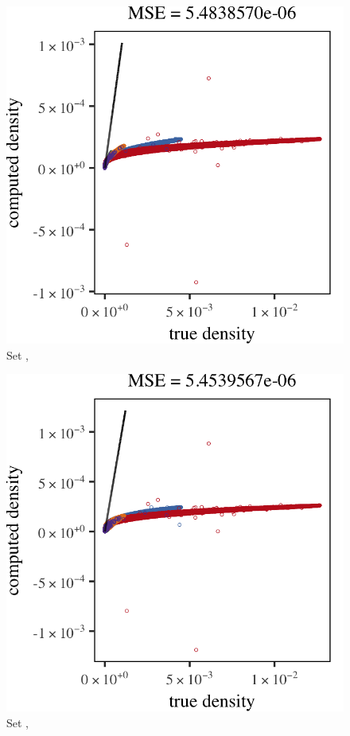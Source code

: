 \begin{subfigure}{0.23\textwidth}
	\centering
	\includegraphics[keepaspectratio=true, width=\textwidth, height=0.23\textheight]{result/img/all/results_ferdosi_3_120000_sambe_silverman}
	\caption{Set \ferdosiThree, \sambe}
	\label{fig:results:multisphere:sambe:ferdosi3}
\end{subfigure}
\begin{subfigure}{0.23\textwidth}
	\centering
	\includegraphics[keepaspectratio=true, width=\textwidth, height=0.23\textheight]{result/img/all/results_baakman_3_120000_sambe_silverman}
	\caption{Set \baakmanThree, \sambe}
	\label{fig:results:multisphere:sambe:baakman3}
\end{subfigure}	